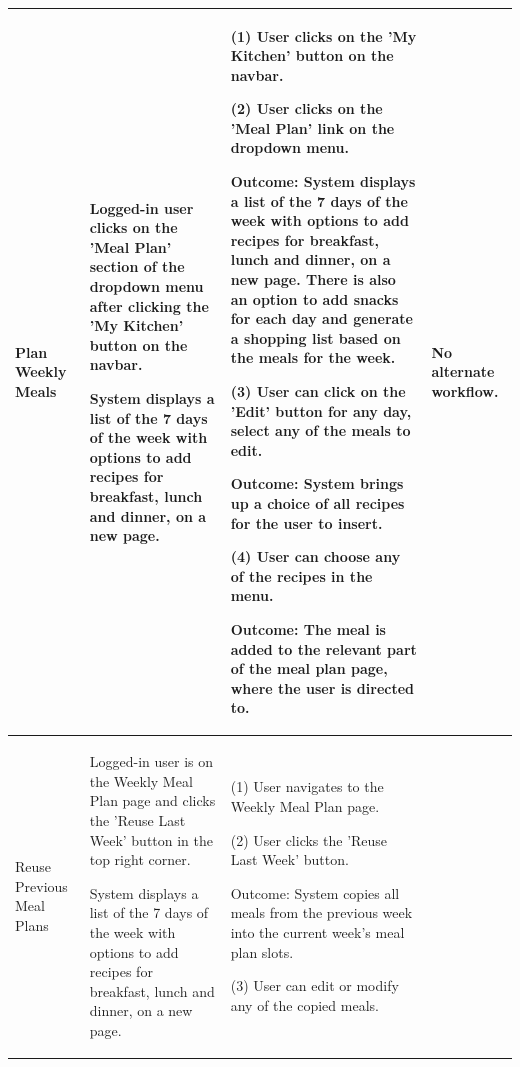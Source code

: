 \documentclass[10pt,a4paper]{article}
\begin{document}
\begin{longtable}{|p{30mm}|p{30mm}|p{40mm}|p{40mm}|}
\hline
Plan Weekly Meals
&
Logged-in user clicks on the 'Meal Plan' section of the dropdown menu after clicking the 'My Kitchen' button on the navbar.

System displays a list of the 7 days of the week with options to add recipes for breakfast, lunch and dinner, on a new page.
&
(1) User clicks on the 'My Kitchen' button on the navbar.

\vspace{1 mm}

(2) User clicks on the 'Meal Plan' link on the dropdown menu.

Outcome: System displays a list of the 7 days of the week with options to add recipes for breakfast, lunch and dinner, on a new page. There is also an option to add snacks for each day and generate a shopping list based on the meals for the week.

\vspace{1 mm}

(3) User can click on the 'Edit' button for any day, select any of the meals to edit.

Outcome: System brings up a choice of all recipes for the user to insert.

\vspace{1 mm}

(4) User can choose any of the recipes in the menu.

Outcome: The meal is added to the relevant part of the meal plan page, where the user is directed to.

&
No alternate workflow. \\




\hline
Reuse Previous Meal Plans
&
Logged-in user is on the Weekly Meal Plan page and clicks the 'Reuse Last Week' button in the top right corner.

System displays a list of the 7 days of the week with options to add recipes for breakfast, lunch and dinner, on a new page.
&
(1) User navigates to the Weekly Meal Plan page.

\vspace{1 mm}

(2) User clicks the 'Reuse Last Week' button.

Outcome: System copies all meals from the previous week into the current week's meal plan slots.

\vspace{1 mm}

(3) User can edit or modify any of the copied meals.


\end{longtable}
\end{document}
